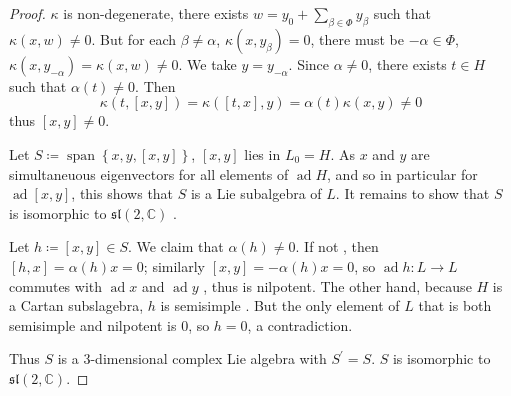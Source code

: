 \documentclass[../main.tex]{subfiles}
\begin{document}
\begin{proof}
    \(   \kappa   \) is non-degenerate, there exists \(  w = y_0+ \sum _{\beta  \in \Phi }y_{\beta }  \) such that \(   \kappa \left( x,w \right)\neq 0   \). But for each \(  \beta \neq \alpha   \), \(   \kappa \left( x,y_{\beta } \right)= 0   \), there must be \(  -\alpha \in \Phi   \), \(   \kappa \left( x,y_{- \alpha } \right)=  \kappa \left( x,w \right)\neq 0    \). We take \(  y= y_{-\alpha }  \).  Since \(  \alpha \neq 0  \), there exists \(  t\in H  \) such that \(  \alpha \left( t \right)  \neq 0 \). Then \[
     \kappa \left( t,[x,y] \right)=  \kappa \left( [t,x],y \right)= \alpha \left( t \right) \kappa \left( x,y \right)\neq 0    
    \]   thus \(  [x,y]  \neq 0\). 

    Let \(  S\coloneqq \operatorname{span}\left\{ x,y,[x,y] \right\}  \), \(  \left[ x,y \right]   \) lies in \(  L_0= H  \). As \(  x  \) and \(  y  \) are simultaneuous eigenvectors for all elements of \(  \operatorname{ad}H  \), and so in particular for \(  \operatorname{ad}[x,y]  \), this shows that \(  S  \) is a Lie subalgebra of \(  L  \). It remains to show that \(  S  \) is isomorphic to \(  \mathfrak{sl}\left( 2,\mathbb{C}  \right)   \)   .
    
    
    Let \(  h\coloneqq \left[ x,y \right]\in S   \). We claim that \(  \alpha \left( h \right)\neq 0   \). If not , then \(  \left[ h,x \right]= \alpha \left( h \right)x= 0    \); similarly \(  \left[ x,y \right]= -\alpha \left( h \right)x= 0    \), so \(  \operatorname{ad}h:L\to L  \) commutes     with \(  \operatorname{ad}x  \) and \(  \operatorname{ad}y  \) , thus is nilpotent. The other hand, because \(  H  \) is a Cartan subslagebra, \(  h  \) is semisimple  . But the only element of \(  L  \) that is both semisimple and nilpotent is \(  0  \), so \(  h= 0  \), a contradiction.
    
    Thus \(  S  \) is a 3-dimensional complex Lie algebra with \(  S^{\prime} = S  \). \(  S  \) is isomorphic to \(  \mathfrak{sl}\left( 2,\mathbb{C}  \right)   \).    
\end{proof}
\end{document}
